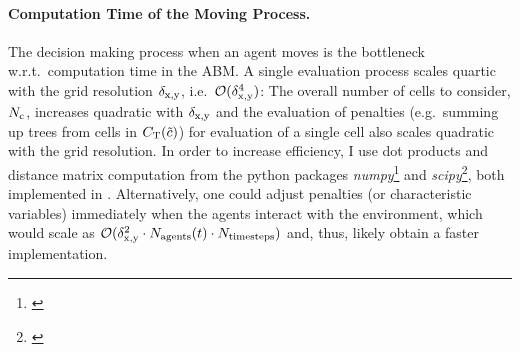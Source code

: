 \paragraph{Computation Time of the Moving Process.}
The decision making process when an agent moves is the bottleneck w.r.t.\ computation time in the ABM.
A single evaluation process scales quartic with the grid resolution $\delta_{\rm x,y}$, i.e.\ $\mathcal{O}(\delta_{\rm x,y}^4)$: The overall number of cells to consider, $N_{\rm c}$, increases quadratic with $\delta_{\rm x,y}$ and the evaluation of penalties (e.g.\ summing up trees from cells in $C_{\rm T}(\tilde{c})$) for evaluation of a single cell also scales quadratic with the grid resolution.
In order to increase efficiency, I use dot products and distance matrix computation from the python packages \textit{numpy}\footnote{\citet{numpy}} and \textit{scipy}\footnote{\citet{scipy}}, both implemented in \CC.
Alternatively, one could adjust penalties (or characteristic variables) immediately when the agents interact with the environment, which would scale as $\mathcal{O}(\delta_{\rm x,y}^2\cdot N_{\rm agents}(t)\cdot N_{\rm timesteps})$ and, thus, likely obtain a faster implementation.
	
		
		

















